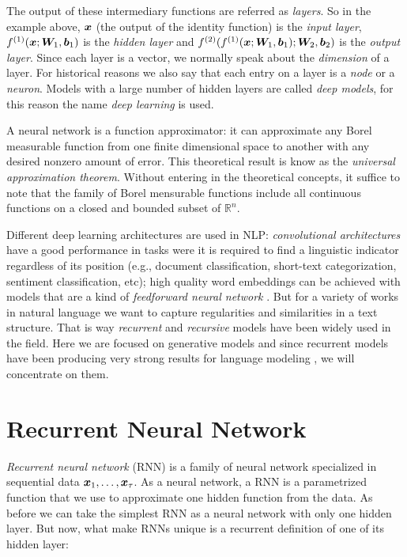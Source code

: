 The output of these intermediary functions are referred as \textit{layers}. So in the example above, $\bm{x}$ (the output of the identity function) is the \textit{input layer}, $f^{(1)}(\bm{x}; \bm{W}_1, \bm{b}_1)$ is the \textit{hidden layer} and $f^{(2)}(f^{(1)}(\bm{x}; \bm{W}_1, \bm{b}_1); \bm{W}_2, \bm{b}_2)$ is the \textit{output layer}. Since each layer is a vector, we normally speak about the \textit{dimension} of a layer. For historical reasons we also say that each entry on a layer is a \textit{node} or a \textit{neuron}.  Models with a large number of hidden layers are called \textit{deep models}, for this reason the name \textit{deep learning} is used.  

\par A neural network is a function approximator: it can approximate any Borel measurable function from one finite dimensional space to another with any desired nonzero amount of error. This theoretical result is know as the \textit{universal approximation theorem}\cite{Cybenko}. Without entering in the theoretical concepts, it suffice to note that the family of Borel mensurable functions include all continuous functions on a closed and bounded subset of $\mathbb{R}^n$.



Different deep learning architectures are used in NLP: \textit{convolutional architectures} have a good performance in tasks were it is required to find a linguistic indicator regardless of its position (e.g., document classification, short-text categorization, sentiment classification, etc); high quality word embeddings can be achieved with models that are a kind of \textit{feedforward neural network} \cite{Mikolov23}. But for a variety of works in natural language we want to capture regularities and similarities in a text structure. That is way \textit{recurrent} and \textit{recursive} models have been widely used in the field. Here we are focused on generative models and since recurrent models have been producing very strong results for language modeling \cite{goldberg15}, we will concentrate on them.

\section{Recurrent Neural Network}
\label{sec:RNN}


\textit{Recurrent neural network} (RNN) is a family of neural network specialized in sequential data $\bm{x}_1, \dots, \bm{x}_\tau$. As a neural network, a RNN is a parametrized function that we use to approximate one hidden function from the data. As before we can take the simplest RNN as a neural network with only one hidden layer. But now, what make RNNs unique is a recurrent definition of one of its hidden layer:

